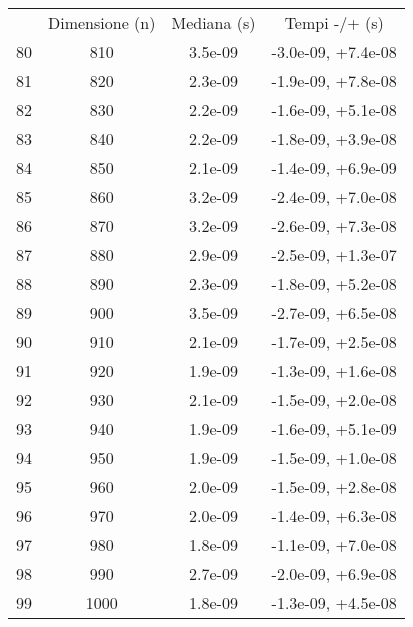 \begin{table}
\centering
\begin{adjustbox}{width=1\textwidth/2}
\begin{tabular}{|c|c|c|c|}
\hline
 & Dimensione (n) & Mediana (s) & Tempi -/+ (s) \\
80 & 810 & 3.5e-09 & -3.0e-09, +7.4e-08 \\
\cline{1-4}
81 & 820 & 2.3e-09 & -1.9e-09, +7.8e-08 \\
\cline{1-4}
82 & 830 & 2.2e-09 & -1.6e-09, +5.1e-08 \\
\cline{1-4}
83 & 840 & 2.2e-09 & -1.8e-09, +3.9e-08 \\
\cline{1-4}
84 & 850 & 2.1e-09 & -1.4e-09, +6.9e-09 \\
\cline{1-4}
85 & 860 & 3.2e-09 & -2.4e-09, +7.0e-08 \\
\cline{1-4}
86 & 870 & 3.2e-09 & -2.6e-09, +7.3e-08 \\
\cline{1-4}
87 & 880 & 2.9e-09 & -2.5e-09, +1.3e-07 \\
\cline{1-4}
88 & 890 & 2.3e-09 & -1.8e-09, +5.2e-08 \\
\cline{1-4}
89 & 900 & 3.5e-09 & -2.7e-09, +6.5e-08 \\
\cline{1-4}
90 & 910 & 2.1e-09 & -1.7e-09, +2.5e-08 \\
\cline{1-4}
91 & 920 & 1.9e-09 & -1.3e-09, +1.6e-08 \\
\cline{1-4}
92 & 930 & 2.1e-09 & -1.5e-09, +2.0e-08 \\
\cline{1-4}
93 & 940 & 1.9e-09 & -1.6e-09, +5.1e-09 \\
\cline{1-4}
94 & 950 & 1.9e-09 & -1.5e-09, +1.0e-08 \\
\cline{1-4}
95 & 960 & 2.0e-09 & -1.5e-09, +2.8e-08 \\
\cline{1-4}
96 & 970 & 2.0e-09 & -1.4e-09, +6.3e-08 \\
\cline{1-4}
97 & 980 & 1.8e-09 & -1.1e-09, +7.0e-08 \\
\cline{1-4}
98 & 990 & 2.7e-09 & -2.0e-09, +6.9e-08 \\
\cline{1-4}
99 & 1000 & 1.8e-09 & -1.3e-09, +4.5e-08 \\
\cline{1-4}
\end{tabular}
\end{adjustbox}
\end{table}


